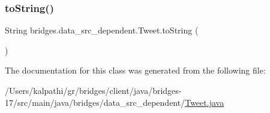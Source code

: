 \mbox{\label{classbridges_1_1data__src__dependent_1_1_tweet_adfba67504a7463a7f16aff46d2bb893f}} 
\subsubsection{\texorpdfstring{to\+String()}{toString()}}
{\footnotesize\ttfamily String bridges.\+data\+\_\+src\+\_\+dependent.\+Tweet.\+to\+String (\begin{DoxyParamCaption}{ }\end{DoxyParamCaption})}



The documentation for this class was generated from the following file\+:\begin{DoxyCompactItemize}
\item 
/\+Users/kalpathi/gr/bridges/client/java/bridges-\/17/src/main/java/bridges/data\+\_\+src\+\_\+dependent/\mbox{\hyperlink{_tweet_8java}{Tweet.\+java}}\end{DoxyCompactItemize}
